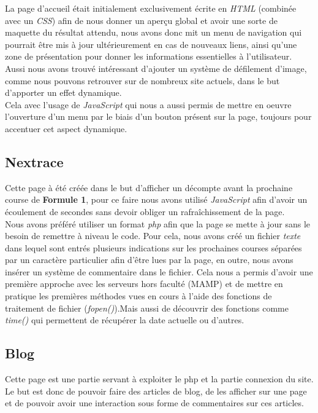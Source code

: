 \documentclass{article}
\begin{document}
La page d'accueil était initialement exclusivement écrite en \emph{HTML} (combinée avec un \emph{CSS}) afin de nous donner un aperçu global et avoir une sorte de maquette du résultat attendu, nous avons donc mit un menu de navigation qui pourrait être mis à jour ultérieurement en cas de nouveaux liens, ainsi qu'une zone de présentation pour donner les informations essentielles à l'utilisateur.\\

Aussi nous avons trouvé intéressant d'ajouter un système de défilement d'image, comme nous pouvons retrouver sur de nombreux site actuels, dans le but d'apporter un effet dynamique.\\
Cela avec l'usage de \emph{JavaScript} qui nous a aussi permis de mettre en oeuvre l'ouverture d'un menu par le biais d'un bouton présent sur la page, toujours pour accentuer cet aspect dynamique.

\subsection{Nextrace}

Cette page à été créée dans le but d'afficher un décompte avant la prochaine course de \textbf{Formule 1}, pour ce faire nous avons utilisé \emph{JavaScript} afin d'avoir un écoulement de secondes sans devoir obliger un rafraîchissement de la page.\\

Nous avons préféré utiliser un format \emph{php} afin que la page se mette à jour sans le besoin de remettre à niveau le code. Pour cela, nous avons créé un fichier \emph{texte} dans lequel sont entrés plusieurs indications sur les prochaines courses séparées par un caractère particulier afin d'être lues par la page, en outre, nous avons insérer un système de commentaire dans le fichier. Cela nous a permis d'avoir une première approche avec les serveurs hors faculté (MAMP) et de mettre en pratique les premières méthodes vues en cours à l'aide des fonctions de traitement de fichier (\emph{fopen()}).Mais aussi de découvrir des fonctions comme \emph{time()} qui permettent de récupérer la date actuelle ou d'autres. 

\subsection{Blog}

Cette page est une partie servant à exploiter le php et la partie connexion du site.
Le but est donc de pouvoir faire des articles de blog, de les afficher sur une page et de pouvoir avoir une interaction sous forme de commentaires sur ces articles.\\
\end{document}

